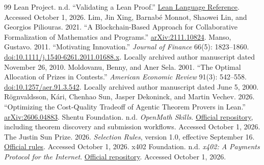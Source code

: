 \documentclass[11pt,a4paper]{article}
\begin{document}
\begin{thebibliography}{99}
 Lean Project. n.d. ``Validating a Lean Proof.'' \href{https://lean-lang.org/doc/reference/latest/ValidatingProofs/}{Lean Language Reference}. Accessed October 1, 2026.
 Lim, Jin Xing, Barnab\'e Monnot, Shaowei Lin, and Georgios Piliouras. 2021. ``A Blockchain-Based Approach for Collaborative Formalization of Mathematics and Programs.'' \href{https://arxiv.org/abs/2111.10824}{arXiv:2111.10824}.
 Manso, Gustavo. 2011. ``Motivating Innovation.'' \emph{Journal of Finance} 66(5): 1823--1860. \href{https://doi.org/10.1111/j.1540-6261.2011.01688.x}{doi:10.1111/j.1540-6261.2011.01688.x}. Locally archived author manuscript dated November 26, 2010.
 Moldovanu, Benny, and Aner Sela. 2001. ``The Optimal Allocation of Prizes in Contests.'' \emph{American Economic Review} 91(3): 542--558. \href{https://doi.org/10.1257/aer.91.3.542}{doi:10.1257/aer.91.3.542}. Locally archived author manuscript dated June 5, 2000.
 R\"ognvaldsson, K\'ari, Chenhao Sun, Jasper Dekoninck, and Martin Vechev. 2026. ``Optimizing the Cost-Quality Tradeoff of Agentic Theorem Provers in Lean.'' \href{https://arxiv.org/abs/2606.04883}{arXiv:2606.04883}.
 Shentu Foundation. n.d. \emph{OpenMath Skills}. \href{https://github.com/shentufoundation/openmath-skills}{Official repository}, including theorem discovery and submission workflows. Accessed October 1, 2026.
 The Justin Sun Prize. 2026. \emph{Selection Rules}, version 1.0, effective September 16. \href{https://www.hejustinsun.com/prize/rules}{Official rules}. Accessed October 1, 2026.
 x402 Foundation. n.d. \emph{x402: A Payments Protocol for the Internet}. \href{https://github.com/x402-foundation/x402}{Official repository}. Accessed October 1, 2026.
\end{thebibliography}
\end{document}

